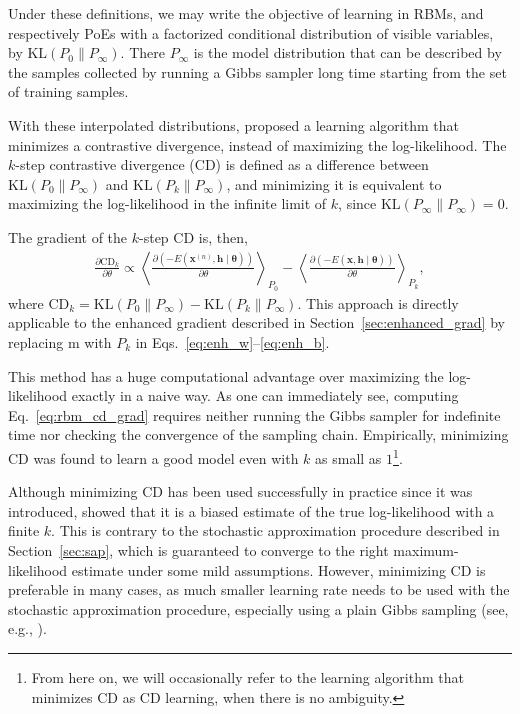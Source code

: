 \documentclass[dissertation,nocontribution,draft*]{aaltoseries}
\newcommand{\vect}[1]{\mathbf{#1}}
\newcommand{\vects}[1]{\boldsymbol{#1}}
\newcommand{\vh}[0]{\vect{h}}
\newcommand{\vx}[0]{\vect{x}}
\newcommand{\tf}[0]{\text{m}}
\newcommand{\TT}[0]{{\vects{\theta}}}
\newcommand{\KL}[0]{\text{KL}}
\newcommand{\CD}[0]{\text{CD}}
\begin{document}
Under these definitions, we may write the objective of
learning in RBMs, and respectively PoEs with a factorized
conditional distribution of visible variables, by $\KL(P_0
\| P_\infty)$. There $P_\infty$ is the model distribution
that can be described by the samples collected by running a
Gibbs sampler long time starting from the set of training
samples.

With these interpolated distributions, \citet{Hinton2002}
proposed a learning algorithm that minimizes a contrastive
divergence, instead of maximizing the log-likelihood. The
$k$-step contrastive divergence
(CD) is defined as a
difference between $\KL(P_0 \| P_{\infty})$ and $\KL(P_k \|
P_\infty)$, and minimizing it is equivalent to maximizing
the log-likelihood in the infinite limit of $k$, since
$\KL(P_\infty \| P_\infty) = 0$.

The gradient of the $k$-step CD is, then,
\begin{align}
    \label{eq:rbm_cd_grad}
    \frac{\partial \CD_k}{\partial \theta} \propto
    \left< \frac{\partial
    \left(-E(\vx^{(n)}, \vh\mid\TT)\right)}{\partial \theta}
    \right>_{P_0} 
    -
    \left< \frac{\partial
    \left(-E(\vx, \vh\mid\TT)\right)}{\partial \theta}
    \right>_{P_k},
\end{align}
where $\CD_k = \KL(P_0 \| P_{\infty}) - \KL(P_k
\| P_\infty)$. This approach is directly applicable to the
enhanced gradient described in
Section~\ref{sec:enhanced_grad} by replacing $\tf$ with
$P_k$ in Eqs.~\eqref{eq:enh_w}--\eqref{eq:enh_b}.

This method has a huge computational advantage over
maximizing the log-likelihood exactly in a naive way. As one
can immediately see, computing Eq.~\eqref{eq:rbm_cd_grad}
requires neither running the Gibbs sampler for indefinite
time nor checking the convergence of the sampling chain.
Empirically, minimizing CD was found to learn a good model
even with $k$ as small as $1$\footnote{ From here on, we
will occasionally refer to the learning algorithm that
minimizes CD as CD learning, when there is no ambiguity.  }.

Although minimizing CD has been used successfully in
practice since it was introduced,
\cite{Carreira-Perpinan2005,Bengio2009} showed that it is a
biased estimate of the true log-likelihood with a finite
$k$. This is contrary to the stochastic approximation
procedure described in Section~\ref{sec:sap}, which is
guaranteed to converge to the right maximum-likelihood
estimate under some mild assumptions. However, minimizing CD
is preferable in many cases,
as
much smaller learning rate needs to be used with the
stochastic approximation procedure, especially using a plain
Gibbs sampling (see, e.g., \citep{Hinton2012rbm}).
\end{document}
